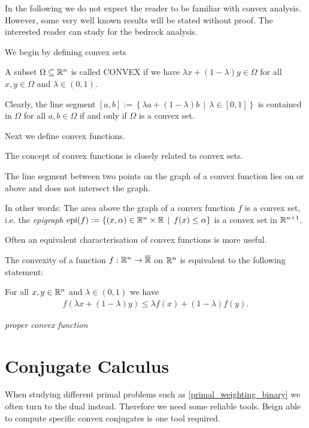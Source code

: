 In the following we do not expect the reader to be familiar with convex analysis. However, some very well known results will be stated without proof. The interested reader can study \cite{Mordukhovich2022} for the bedrock analysis.


We begin by defining convex sets
%

\begin{definition}
  A subset $\Omega\subseteq \mathbb{R}^n$ is called CONVEX if we have $\lambda x+(1-\lambda)y\in \Omega$ for all $x,y\in \Omega$ and $\lambda\in (0,1)$. 
\end{definition}

Clearly, the line segment 
$[a,b]:=\left\{ \lambda a+(1-\lambda)b\,\mid \, \lambda\in [0,1] \right\}$ is contained in $\Omega$ for all $a,b\in \Omega$ if and only if $\Omega$ is a convex set.
%

Next we define convex functions. 
%

The concept of convex functions is closely related to convex sets.
%  
 
The line segment between two points on the graph of a convex function lies on or above and does not intersect the graph.
%

In other words: The area above the graph of a convex function $f$ is a convex set, i.e. the \textit{epigraph}
$\text{epi}(f):=\left\{ (x,\alpha)\in \mathbb{R}^n\times\mathbb{R}\,\mid\, f(x)\le \alpha\right\}$ is a convex set in $\mathbb{R}^{n+1}$.
%

Often an equivalent characterisation of convex functions is more useful.
%

\begin{theorem}
  The convexity of a function $f:\mathbb{R}^n\to \overline{\mathbb{R}}$ on $\mathbb{R}^n$ is equivalent to the following statement:

  For all $x,y\in \mathbb{R}^n$ and $\lambda\in(0,1)$ we have 
    \begin{align}
      f(\lambda x + (1-\lambda)y)\le \lambda f(x)+(1-\lambda)f(y).
    \end{align}
\end{theorem}


\begin{definition}
  \emph{proper convex function}
\end{definition}


\section{Conjugate Calculus}
When studying different primal problems such as \eqref{primal_weighting_binary} we often turn to the dual instead.
Therefore we need some reliable tools.
Beign able to compute specific convex conjugates is one tool required.


